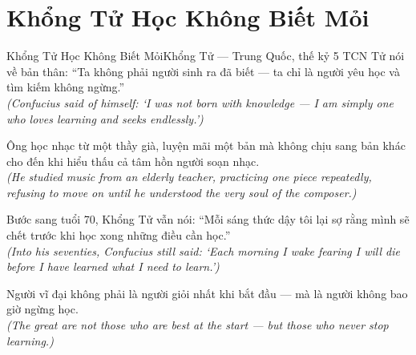 \section{Khổng Tử Học Không Biết Mỏi}
\begin{truyen}{Khổng Tử Học Không Biết Mỏi}{Khổng Tử --- Trung Quốc, thế kỷ 5 TCN}
 Tử nói về bản thân: ``Ta không phải người sinh ra đã biết --- ta chỉ là người yêu học và tìm kiếm không ngừng.''\\[4pt]
\textit{(Confucius said of himself: `I was not born with knowledge --- I am simply one who loves learning and seeks endlessly.')}

Ông học nhạc từ một thầy già, luyện mãi một bản mà không chịu sang bản khác cho đến khi hiểu thấu cả tâm hồn người soạn nhạc.\\[4pt]
\textit{(He studied music from an elderly teacher, practicing one piece repeatedly, refusing to move on until he understood the very soul of the composer.)}

Bước sang tuổi 70, Khổng Tử vẫn nói: ``Mỗi sáng thức dậy tôi lại sợ rằng mình sẽ chết trước khi học xong những điều cần học.''\\[4pt]
\textit{(Into his seventies, Confucius still said: `Each morning I wake fearing I will die before I have learned what I need to learn.')}

\end{truyen}
\begin{baihoc}
  Người vĩ đại không phải là người giỏi nhất khi bắt đầu --- mà là người không bao giờ ngừng học.\\[4pt]
  \textit{(The great are not those who are best at the start --- but those who never stop learning.)}
\end{baihoc}
